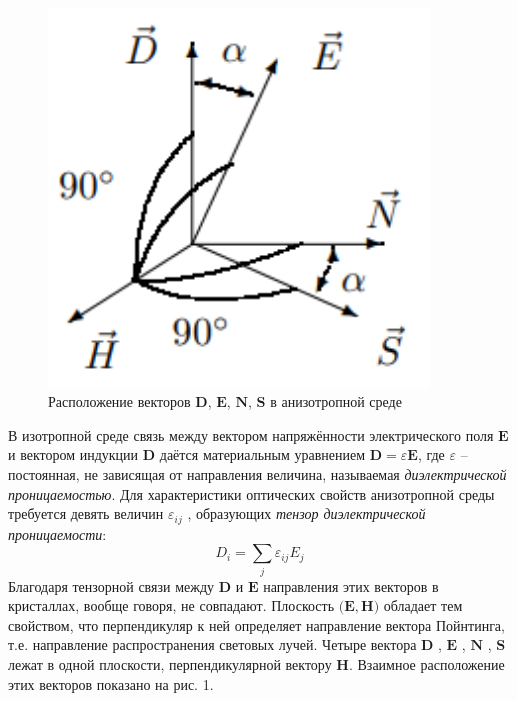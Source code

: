 \documentclass[a4paper,12pt]{article}
\begin{document}
\begin{figure}\label{fig: Vectors' location}
    \begin{center}
    \vspace{-20pt}
        \includegraphics[width = 0.9\textwidth]{Vectors' location.png}
    \end{center}
    \caption{Расположение векторов $\mathbf{D}$, $\mathbf{E}$, $\mathbf{N}$, $\mathbf{S}$ в анизотропной среде}
\end{figure}
В изотропной среде связь между вектором напряжённости электрического поля $\mathbf{E}$ и вектором индукции $\mathbf{D}$ даётся материальным уравнением $\mathbf{D} = \varepsilon\mathbf{E}$, где $\varepsilon$ -- постоянная, не зависящая от направления величина, называемая \textit{диэлектрической проницаемостью}. Для характеристики оптических свойств анизотропной среды требуется девять величин $\varepsilon_{ij}$ , образующих \textit{тензор диэлектрической проницаемости}:
\begin{equation}\label{eq: Tenzor eps}
    D_i = \sum_j \varepsilon_{ij}E_j 
\end{equation}
Благодаря тензорной связи между $\mathbf{D}$ и $\mathbf{E}$ направления этих векторов в кристаллах, вообще говоря, не совпадают. Плоскость $\big(\mathbf{E}, \mathbf{H}\big)$ обладает тем свойством, что перпендикуляр к ней определяет направление вектора Пойнтинга, т.е. направление распространения световых
лучей. Четыре вектора $\mathbf{D}$ , $\mathbf{E}$ , $\mathbf{N}$ , $\mathbf{S}$ лежат в одной плоскости, перпендикулярной вектору $\mathbf{H}$. Взаимное расположение этих векторов показано на рис. 1. 
\end{document}
